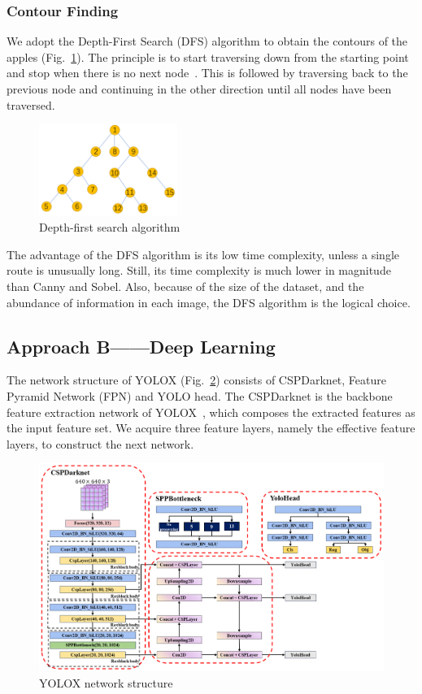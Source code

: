 \subsubsection{Contour Finding}
We adopt the Depth-First Search (DFS) algorithm to obtain the contours of the apples (Fig.~\ref{fig:DFS}). The principle is to start traversing down from the starting point and stop when there is no next node~\citep{Gross2003}. This is followed by traversing back to the previous node and continuing in the other direction until all nodes have been traversed.

\begin{figure}[htb]
    \centering
    \includegraphics[width=0.4\textwidth]{images/Depth-first-treepng.png}
    \caption{Depth-first search algorithm}
    \label{fig:DFS}
\end{figure}

The advantage of the DFS algorithm is its low time complexity, unless a single route is unusually long. Still, its time complexity is much lower in magnitude than Canny and Sobel. Also, because of the size of the dataset, and the abundance of information in each image, the DFS algorithm is the logical choice.



\subsection{Approach B——Deep Learning}
The network structure of YOLOX (Fig.~\ref{fig:YoloX network structure}) consists of CSPDarknet, Feature Pyramid Network (FPN) and YOLO head. The CSPDarknet is the backbone feature extraction network of YOLOX~\citep{Ge2021}, which composes the extracted features as the input feature set. We acquire three feature layers, namely the effective feature layers, to construct the next network.

\begin{figure}[!ht]
    \centering
    \includegraphics[width=1.1\textwidth]{images/Yolox_structure.png}
    \caption{YOLOX network structure}
    \label{fig:YoloX network structure}
\end{figure}

